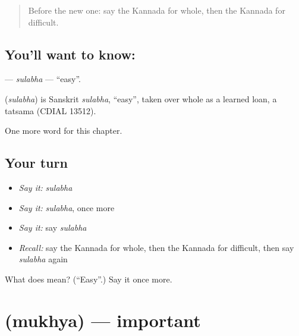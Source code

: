 \label{lesson:KA-C290-sulabha}



\begin{quote}
Before the new one: say the Kannada for whole, then the Kannada for difficult.
\end{quote}

\subsection*{You'll want to know: }
\textbf{} — \emph{sulabha} — \textquotedblleft{}easy\textquotedblright{}.

\begin{cousinweb}
\textbf{} (\emph{sulabha}) is Sanskrit \emph{sulabha}, \textquotedblleft{}easy\textquotedblright{}, taken over whole as a learned loan, a tatsama (CDIAL 13512).
\end{cousinweb}

\begin{grammarlens}[title={What you've built}]
One more word for this chapter.
\end{grammarlens}

\subsection*{Your turn}
\begin{itemize}
\raggedright
  \item \emph{Say it:} \emph{sulabha}
  \item \emph{Say it:} \emph{sulabha}, once more
  \item \emph{Say it:} say \emph{sulabha}
  \item \emph{Recall:} say the Kannada for whole, then the Kannada for difficult, then say \emph{sulabha} again
\end{itemize}

\begin{tcolorbox}[breakable,colback=teal!4,colframe=teal!35!black,title={Before you move on}]
What does  mean? (\textquotedblleft{}Easy\textquotedblright{}.) Say it once more.
\end{tcolorbox}
\section[\texorpdfstring{\kn{ಮುಖ್ಯ} (mukhya)}{ಮುಖ್ಯ (mukhya)}]{ (mukhya) — important}

\label{lesson:KA-C290-mukhya}



